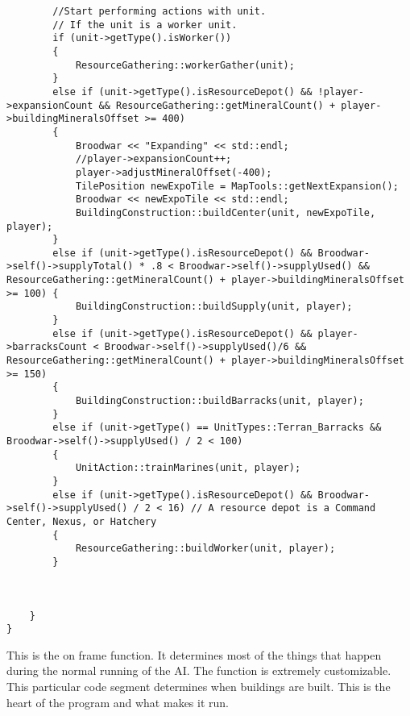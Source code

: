 \documentclass[10pt,letterpaper,onecolumn,draftclsnofoot]{IEEEtran}
\begin{document}
\begin{lstlisting}
		//Start performing actions with unit.
		// If the unit is a worker unit.
		if (unit->getType().isWorker())
		{
			ResourceGathering::workerGather(unit);
		}
		else if (unit->getType().isResourceDepot() && !player->expansionCount && ResourceGathering::getMineralCount() + player->buildingMineralsOffset >= 400)
		{
			Broodwar << "Expanding" << std::endl;
			//player->expansionCount++;
			player->adjustMineralOffset(-400);
			TilePosition newExpoTile = MapTools::getNextExpansion();
			Broodwar << newExpoTile << std::endl;
			BuildingConstruction::buildCenter(unit, newExpoTile, player);
		}
		else if (unit->getType().isResourceDepot() && Broodwar->self()->supplyTotal() * .8 < Broodwar->self()->supplyUsed() && ResourceGathering::getMineralCount() + player->buildingMineralsOffset >= 100) {
			BuildingConstruction::buildSupply(unit, player);
		}
		else if (unit->getType().isResourceDepot() && player->barracksCount < Broodwar->self()->supplyUsed()/6 && ResourceGathering::getMineralCount() + player->buildingMineralsOffset >= 150)
		{
			BuildingConstruction::buildBarracks(unit, player);
		}
		else if (unit->getType() == UnitTypes::Terran_Barracks && Broodwar->self()->supplyUsed() / 2 < 100)
		{
			UnitAction::trainMarines(unit, player);
		}
		else if (unit->getType().isResourceDepot() && Broodwar->self()->supplyUsed() / 2 < 16) // A resource depot is a Command Center, Nexus, or Hatchery
		{
			ResourceGathering::buildWorker(unit, player);
		}

		
		
	}
}
\end{lstlisting}
This is the on frame function. It determines most of the things that happen during the normal running of the AI. The function is extremely customizable. This particular code segment determines when buildings are built.  This is the heart of the program and what makes it run.
\end{document}

